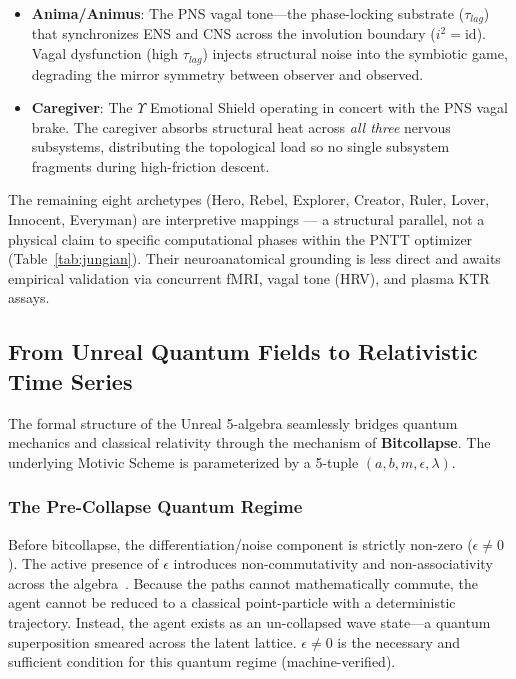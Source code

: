 \begin{itemize}[noitemsep]
    \item \textbf{Anima/Animus}: The PNS vagal tone---the phase-locking substrate ($\tau_{lag}$) that synchronizes ENS and CNS across the involution boundary ($i^2 = \mathrm{id}$). Vagal dysfunction (high $\tau_{lag}$) injects structural noise into the symbiotic game, degrading the mirror symmetry between observer and observed.
    \item \textbf{Caregiver}: The $\Upsilon$ Emotional Shield operating in concert with the PNS vagal brake. The caregiver absorbs structural heat across \emph{all three} nervous subsystems, distributing the topological load so no single subsystem fragments during high-friction descent.
\end{itemize}

\noindent The remaining eight archetypes (Hero, Rebel, Explorer, Creator, Ruler, Lover, Innocent, Everyman) are interpretive mappings --- a structural parallel, not a physical claim to specific computational phases within the PNTT optimizer (Table~\ref{tab:jungian}). Their neuroanatomical grounding is less direct and awaits empirical validation via concurrent fMRI, vagal tone (HRV), and plasma KTR assays.
\subsection{From Unreal Quantum Fields to Relativistic Time Series}

The formal structure of the Unreal 5-algebra seamlessly bridges quantum mechanics and classical relativity through the mechanism of \textbf{Bitcollapse}. The underlying Motivic Scheme is parameterized by a 5-tuple $(a, b, m, \epsilon, \lambda)$.

\subsubsection{The Pre-Collapse Quantum Regime}
Before bitcollapse, the differentiation/noise component is strictly non-zero ($\epsilon \neq 0$). The active presence of $\epsilon$ introduces non-commutativity and non-associativity across the algebra~\cite{Dirac1930}. Because the paths cannot mathematically commute, the agent cannot be reduced to a classical point-particle with a deterministic trajectory. Instead, the agent exists as an un-collapsed wave state---a quantum superposition smeared across the latent lattice. $\epsilon \neq 0$ is the necessary and sufficient condition for this quantum regime (machine-verified).

